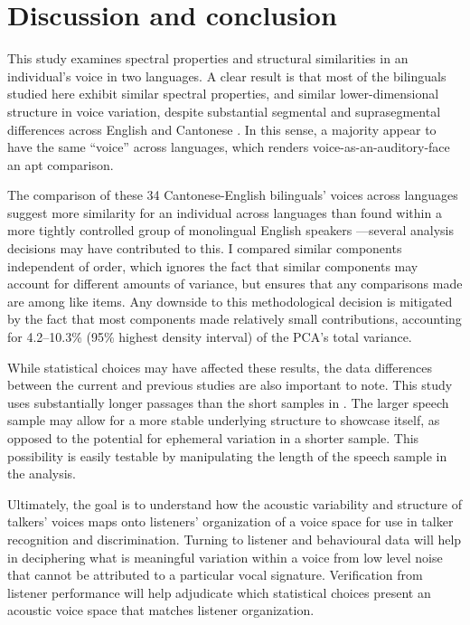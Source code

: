 \section{Discussion and conclusion}\label{ch3:sec:discussion}

This study examines spectral properties and structural similarities in an individual's voice in two languages. A clear result is that most of the bilinguals studied here exhibit similar spectral properties, and similar lower-dimensional structure in voice variation, despite substantial segmental and suprasegmental differences across English and Cantonese \citep{matthews_2013_cantonese}. In this sense, a majority appear to have the same ``voice'' across languages, which renders voice-as-an-auditory-face an apt comparison.

The comparison of these 34 Cantonese-English bilinguals' voices across languages suggest more similarity for an individual across languages than found within a more tightly controlled group of monolingual English speakers \citep{lee_2019_acoustic}---several analysis decisions may have contributed to this. I compared similar components independent of order, which ignores the fact that similar components may account for different amounts of variance, but ensures that any comparisons made are among like items. Any downside to this methodological decision is mitigated by the fact that most components made relatively small contributions, accounting for 4.2--10.3\% (95\% highest density interval) of the PCA's total variance. 

While statistical choices may have affected these results, the data differences between the current and previous studies are also important to note. This study uses substantially longer passages than the short samples in \citet{lee_2019_acoustic}. The larger speech sample may allow for a more stable underlying structure to showcase itself, as opposed to the potential for ephemeral variation in a shorter sample. This possibility is easily testable by manipulating the length of the speech sample in the analysis.

Ultimately, the goal is to understand how the acoustic variability and structure of talkers' voices maps onto listeners' organization of a voice space for use in talker recognition and discrimination. Turning to listener and behavioural data will help in deciphering what is meaningful variation within a voice from low level noise that cannot be attributed to a particular vocal signature. Verification from listener performance will help adjudicate which statistical choices present an acoustic voice space that matches listener organization. 

\endinput %
